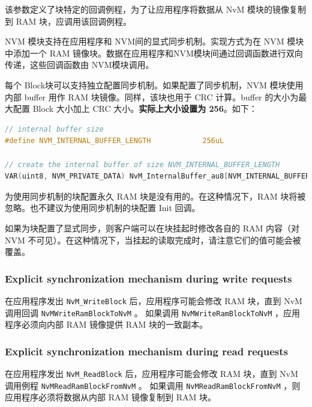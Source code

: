 \begin{definition}
  该参数定义了块特定的回调例程，为了让应用程序将数据从 NvM 模块的镜像复制到 RAM 块，应调用该回调例程。
\end{definition}

NVM 模块支持在应用程序和 NVM间的显式同步机制。实现方式为在 NVM 模块中添加一个 RAM 镜像块。数据在应用程序和NVM模块间通过回调函数进行双向传递，这些回调函数由 NVM模块调用。

每个 Block块可以支持独立配置同步机制。如果配置了同步机制，NVM 模块使用内部 buffer 用作 RAM 块镜像。同样，该块也用于 CRC 计算。buffer 的大小为最大配置 Block 大小加上 CRC 大小。\textbf{实际上大小设置为 256}。如下：

\begin{lstlisting}[language=C,style=C]
  // internal buffer size 
#define NVM_INTERNAL_BUFFER_LENGTH            256uL

// create the internal buffer of size NVM_INTERNAL_BUFFER_LENGTH
VAR(uint8, NVM_PRIVATE_DATA) NvM_InternalBuffer_au8[NVM_INTERNAL_BUFFER_LENGTH];
\end{lstlisting}

为使用同步机制的块配置永久 RAM 块是没有用的。在这种情况下，RAM 块将被忽略。也不建议为使用同步机制的块配置 Init 回调。

\begin{remark}
  如果为块配置了显式同步，则客户端可以在块挂起时修改各自的 RAM 内容（对 NVM 不可见）。在这种情况下，当挂起的读取完成时，请注意它们的值可能会被覆盖。
\end{remark}

\subsubsection{Explicit synchronization mechanism during write requests}
在应用程序发出 \lstinline{NvM_WriteBlock} 后，应用程序可能会修改 RAM 块，直到 NvM 调用回调 \lstinline{NvMWriteRamBlockToNvM} 。
如果调用 \lstinline{NvMWriteRamBlockToNvM} ，应用程序必须向内部 RAM 镜像提供 RAM 块的一致副本。

\subsubsection{Explicit synchronization mechanism during read requests} 
在应用程序发出 \lstinline{NvM_ReadBlock} 后，应用程序可能会修改 RAM 块，直到 NvM 调用例程 \lstinline{NvMReadRamBlockFromNvM} 。
如果调用 \lstinline{NvMReadRamBlockFromNvM} ，则应用程序必须将数据从内部 RAM 镜像复制到 RAM 块。

